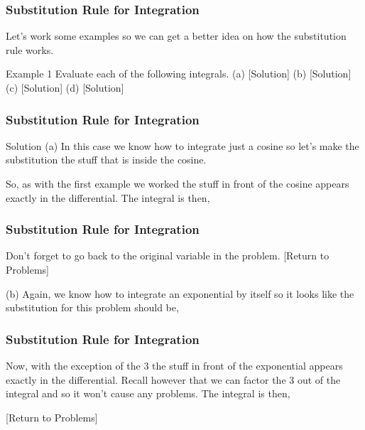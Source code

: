 \documentclass{beamer}
\begin{document}
\begin{frame}
	\frametitle{Substitution Rule for Integration}
	\large
Let’s work some examples so we can get a better idea on how the substitution rule works.
 
Example 1  Evaluate each of the following integrals.
(a)    [Solution]
(b)    [Solution]
(c)    [Solution]
(d)    [Solution]
\end{frame}
\begin{frame}
	\frametitle{Substitution Rule for Integration}
	\large
Solution
(a) 
In this case we know how to integrate just a cosine so let’s make the substitution the stuff that is inside the cosine.
                                         
So, as with the first example we worked the stuff in front of the cosine appears exactly in the differential.  The integral is then,
                                    
\end{frame}
\begin{frame}
	\frametitle{Substitution Rule for Integration}
	\large 
Don’t forget to go back to the original variable in the problem.
[Return to Problems]
 
(b) 
Again, we know how to integrate an exponential by itself so it looks like the substitution for this problem should be,

\end{frame}
\begin{frame}
	\frametitle{Substitution Rule for Integration}
	\large
Now, with the exception of the 3 the stuff in front of the exponential appears exactly in the differential.  Recall however that we can factor the 3 out of the integral and so it won’t cause any problems.  The integral is then,
                                               
[Return to Problems]
\end{frame}
\end{document}

